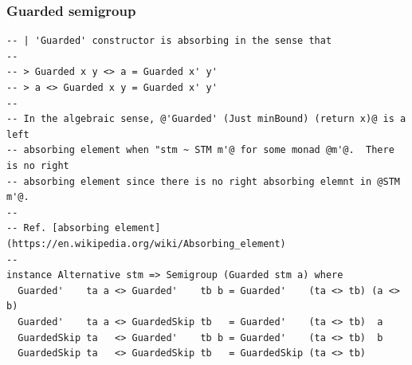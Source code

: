 \documentclass[t,dvipsnames,hyperref={colorlinks,citecolor=NavyBlue,linkcolor=NavyBlue,anchorcolor=NavyBlue,urlcolor=NavyBlue}]{beamer}
\begin{document}
\begin{frame}[fragile]
  \frametitle{Guarded semigroup}
  \begin{verbatim}
-- | 'Guarded' constructor is absorbing in the sense that
--
-- > Guarded x y <> a = Guarded x' y'
-- > a <> Guarded x y = Guarded x' y'
--
-- In the algebraic sense, @'Guarded' (Just minBound) (return x)@ is a left
-- absorbing element when "stm ~ STM m'@ for some monad @m'@.  There is no right
-- absorbing element since there is no right absorbing elemnt in @STM m'@.
--
-- Ref. [absorbing element](https://en.wikipedia.org/wiki/Absorbing_element)
--
instance Alternative stm => Semigroup (Guarded stm a) where
  Guarded'    ta a <> Guarded'    tb b = Guarded'    (ta <> tb) (a <> b)
  Guarded'    ta a <> GuardedSkip tb   = Guarded'    (ta <> tb)  a
  GuardedSkip ta   <> Guarded'    tb b = Guarded'    (ta <> tb)  b
  GuardedSkip ta   <> GuardedSkip tb   = GuardedSkip (ta <> tb)
  \end{verbatim}
\end{frame}
\end{document}
